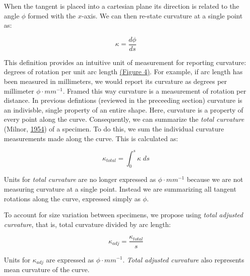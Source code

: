 \documentclass[]{article}
\begin{document}
When the tangent is placed into a cartesian plane its direction is
related to the angle \(\phi\) formed with the \(x\)-axis. We can then
re-state curvature at a single point as:

\begin{equation}
\tag{5}

\kappa = \frac{d\phi}{ds}

\end{equation}

This definition provides an intuitive unit of measurement for reporting
curvature: degrees of rotation per unit arc length
\href{Figure_4.jpg}{(Figure 4)}. For example, if arc length has been
measured in millimeters, we would report its curvature as degrees per
millimeter \(\phi \cdot mm^{-1}\). Framed this way curvature is a
measurement of rotation per distance. In previous defintions (reviewed
in the preceeding section) curvature is an indivisble, single property
of an entire shape. Here, curvature is a property of every point along
the curve. Consequently, we can summarize the \emph{total curvature}
(Milnor, \protect\hyperlink{ref-milnor_1954}{1954}) of a specimen. To do
this, we sum the individual curvature measurements made along the curve.
This is calculated as:

\begin{equation}
\tag{6}

\kappa_{total} = \int_{0}^{s} \kappa \; ds 

\end{equation}

Units for \emph{total curvature} are no longer expressed as
\(\phi \cdot mm^{-1}\) because we are not measuring curvature at a
single point. Instead we are summarizing all tangent rotations along the
curve, expressed simply as \(\phi\).

To account for size variation between specimens, we propose using
\emph{total adjusted curvature}, that is, total curvature divided by arc
length:

\begin{equation}
\tag{7}

\kappa_{adj} = \frac{\kappa_{total}}{s} 

\end{equation}

Units for \(\kappa_{adj}\) are expressed as \(\phi \cdot mm^{-1}\).
\emph{Total adjusted curvature} also represents mean curvature of the
curve.
\end{document}
